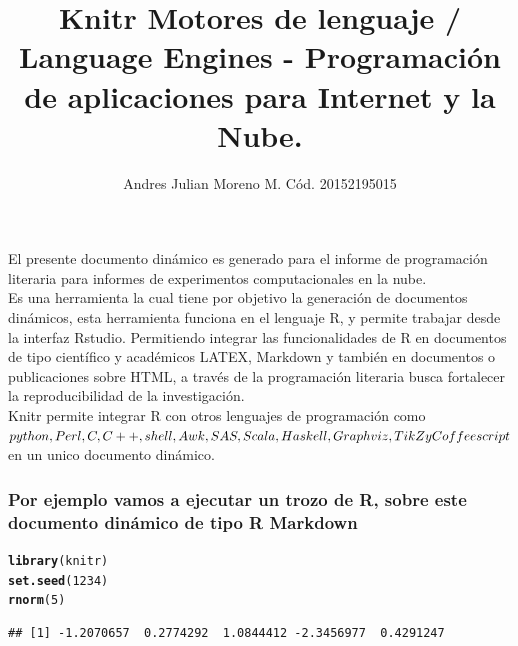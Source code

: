 \documentclass{article}\usepackage[]{graphicx}\usepackage[]{color}
\makeatletter
\newcommand{\hlnum}[1]{\textcolor[rgb]{0.686,0.059,0.569}{#1}}%
\newcommand{\hlstd}[1]{\textcolor[rgb]{0.345,0.345,0.345}{#1}}%
\newcommand{\hlkwd}[1]{\textcolor[rgb]{0.737,0.353,0.396}{\textbf{#1}}}%
\newenvironment{kframe}{%
 \def\at@end@of@kframe{}%
 \ifinner\ifhmode%
  \def\at@end@of@kframe{\end{minipage}}%
  \begin{minipage}{\columnwidth}%
 \fi\fi%
 \def\FrameCommand##1{\hskip\@totalleftmargin \hskip-\fboxsep
 \colorbox{shadecolor}{##1}\hskip-\fboxsep
     \hskip-\linewidth \hskip-\@totalleftmargin \hskip\columnwidth}%
 \MakeFramed {\advance\hsize-\width
   \@totalleftmargin\z@ \linewidth\hsize
   \@setminipage}}%
 {\par\unskip\endMakeFramed%
 \at@end@of@kframe}
\newenvironment{knitrout}{}{} %
\makeatother
\begin{document}
\title{Knitr Motores de lenguaje / Language Engines - Programación de aplicaciones para Internet y la Nube.}
\author{Andres Julian Moreno M. Cód. 20152195015}
\maketitle

El presente documento dinámico es generado para  el informe de programación literaria para informes de experimentos computacionales en la nube.\\

Es una herramienta la cual tiene por objetivo la generación de documentos dinámicos, esta herramienta funciona en el lenguaje R, y permite trabajar desde la interfaz Rstudio. Permitiendo integrar las funcionalidades de R en documentos de tipo científico y académicos LATEX, Markdown y también en documentos o publicaciones sobre HTML, a través de la programación literaria busca fortalecer la reproducibilidad de la investigación.\\

Knitr permite integrar R con otros lenguajes de programación como $python, Perl, C, C++, shell, Awk,\\ SAS, Scala, Haskell, Graphviz, TikZ y Coffeescript$ en un unico documento dinámico.\\

\subsubsection*{Por ejemplo vamos a ejecutar un trozo de R, sobre este documento dinámico de tipo R Markdown}
\begin{knitrout}
\color{fgcolor}\begin{kframe}
\begin{alltt}
\hlkwd{library}\hlstd{(knitr)}
\hlkwd{set.seed}\hlstd{(}\hlnum{1234}\hlstd{)}
\hlkwd{rnorm}\hlstd{(}\hlnum{5}\hlstd{)}
\end{alltt}
\begin{verbatim}
## [1] -1.2070657  0.2774292  1.0844412 -2.3456977  0.4291247
\end{verbatim}
\end{kframe}
\end{knitrout}
\end{document}
